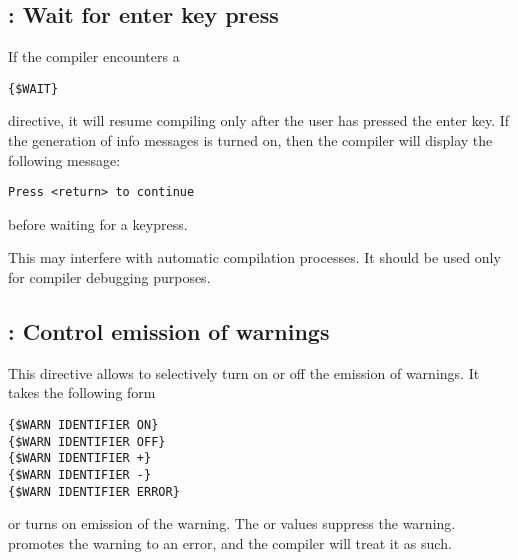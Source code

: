 \subsection{ : Wait for enter key press}

If the compiler encounters a
\begin{verbatim}
{$WAIT}
\end{verbatim}
directive, it will resume compiling only after the user has pressed the
enter key. If the generation of info messages is turned on, then the compiler
will display the following message:
\begin{verbatim}
Press <return> to continue
\end{verbatim}
before waiting for a keypress.
\begin{remark}
This may interfere with automatic compilation processes. 
It should be used only for compiler debugging purposes.
\end{remark}

\subsection{ : Control emission of warnings}
This directive allows to selectively turn on or off the emission of
warnings. It takes the following form
\begin{verbatim}
{$WARN IDENTIFIER ON}
{$WARN IDENTIFIER OFF}
{$WARN IDENTIFIER +}
{$WARN IDENTIFIER -}
{$WARN IDENTIFIER ERROR}
\end{verbatim}
 or \var{+} turns on emission of the warning. The  or
\var{-} values suppress the warning.  promotes the warning to an
error, and the compiler will treat it as such.

